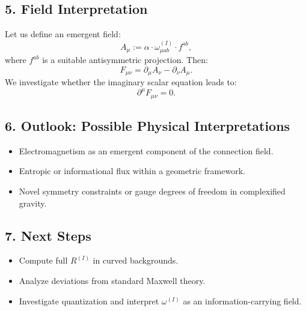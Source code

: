 \subsection*{5. Field Interpretation}

Let us define an emergent field:
\[
A_\mu := \alpha \cdot \omega^{(I)}_{\mu ab} \cdot f^{ab},
\]
where $f^{ab}$ is a suitable antisymmetric projection. Then:
\[
F_{\mu\nu} = \partial_\mu A_\nu - \partial_\nu A_\mu.
\]
We investigate whether the imaginary scalar equation leads to:
\[
\partial^\mu F_{\mu\nu} = 0.
\]

\subsection*{6. Outlook: Possible Physical Interpretations}

\begin{itemize}
  \item Electromagnetism as an emergent component of the connection field.
  \item Entropic or informational flux within a geometric framework.
  \item Novel symmetry constraints or gauge degrees of freedom in complexified gravity.
\end{itemize}

\subsection*{7. Next Steps}

\begin{itemize}
  \item Compute full $R^{(I)}$ in curved backgrounds.
  \item Analyze deviations from standard Maxwell theory.
  \item Investigate quantization and interpret $\omega^{(I)}$ as an information-carrying field.
\end{itemize}
